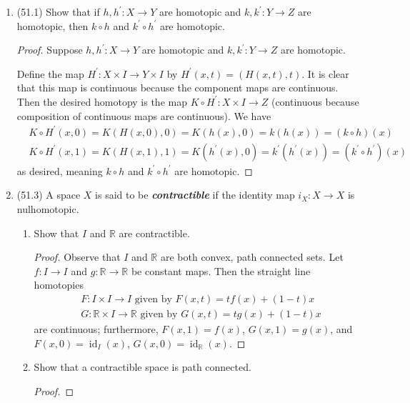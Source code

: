\documentclass[11pt]{article}
\DeclareMathOperator{\id}{id}
\begin{document}
\begin{enumerate}
    \item (51.1) Show that if $h,h^{\prime}\colon X\to Y$ are homotopic and $k,k^{\prime}\colon Y\to Z$ are homotopic, then $k\circ h$ and $k^{\prime}\circ h^{\prime}$ are homotopic.
    \begin{proof}
        Suppose $h,h^{\prime}\colon X\to Y$ are homotopic and $k,k^{\prime}\colon Y\to Z$ are homotopic. 

        Define the map $H^{\prime}\colon X\times I \to Y\times I$ by $H^{\prime}(x,t) = (H(x,t),t)$. It is clear that this map is continuous because the component maps are continuous. Then the desired homotopy is the map $K\circ H^{\prime} \colon X\times I \to Z$ (continuous because composition of continuous maps are continuous). We have \begin{align*}
            &K\circ H^{\prime}(x,0) = K(H(x,0),0) = K(h(x),0) = k(h(x)) = (k\circ h)(x)\\
            &K\circ H^{\prime}(x,1) = K(H(x,1),1) = K(h^{\prime}(x),0) = k^{\prime}(h^{\prime}(x)) = (k^{\prime}\circ h^{\prime})(x)
        \end{align*}
        as desired, meaning $k\circ h$ and $k^{\prime}\circ h^{\prime}$ are homotopic.
    \end{proof}
    \item (51.3) A space $X$ is said to be \textbf{\textit{contractible}} if the identity map $i_X\colon X\to X$ is nulhomotopic. \begin{enumerate}[label=(\alph*)]
        \item Show that $I$ and $\mathbb{R}$ are contractible.
        \begin{proof}
            Observe that $I$ and $\mathbb{R}$ are both convex, path connected sets. Let $f\colon I\to I$ and $g\colon \mathbb{R}\to \mathbb{R}$ be constant maps. Then the straight line homotopies \begin{align*}
                &F\colon I\times I\to I \text{ given by } F(x,t) = tf(x)+(1-t)x\\
                &G\colon \mathbb{R}\times I\to \mathbb{R} \text{ given by } G(x,t) = tg(x)+(1-t)x
            \end{align*} are continuous; furthermore, $F(x,1) = f(x)$, $G(x,1) = g(x)$, and $F(x,0) = \id_I(x)$, $G(x,0) = \id_\mathbb{R}(x)$.
        \end{proof}
        \item Show that a contractible space is path connected.
        \begin{proof}

\end{proof}
\end{enumerate}
\end{enumerate}
\end{document}
